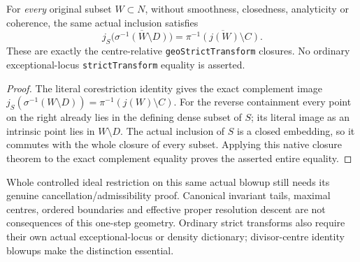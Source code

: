\begin{theorem}
\label{hir:actual-closed-contact-every-subset-strict-closure}
\leanok
For \emph{every} original subset $W\subset N$, without smoothness,
closedness, analyticity or coherence, the same actual inclusion satisfies
\[
 j_S\bigl(\overline{\sigma^{-1}(W\setminus D)}\bigr)
 =\overline{\pi^{-1}(j(W)\setminus C)}.
\]
These are exactly the centre-relative \texttt{geoStrictTransform}
closures. No ordinary exceptional-locus \texttt{strictTransform}
equality is asserted.
\end{theorem}
\begin{proof}
The literal corestriction identity gives the exact complement image
$j_S(\sigma^{-1}(W\setminus D))
=\pi^{-1}(j(W)\setminus C)$. For the reverse containment every point
on the right already lies in the defining dense subset of $S$; its
literal image as an intrinsic point lies in $W\setminus D$.
The actual inclusion of $S$ is a closed embedding, so it commutes with
the whole closure of every subset. Applying this native closure theorem
to the exact complement equality proves the asserted entire equality.
\end{proof}

Whole controlled ideal restriction on this same actual blowup still needs
its genuine cancellation/admissibility proof. Canonical invariant tails,
maximal centres, ordered boundaries and effective proper resolution descent
are not consequences of this one-step geometry. Ordinary strict transforms
also require their own actual exceptional-locus or density dictionary;
divisor-centre identity blowups make the distinction essential.
